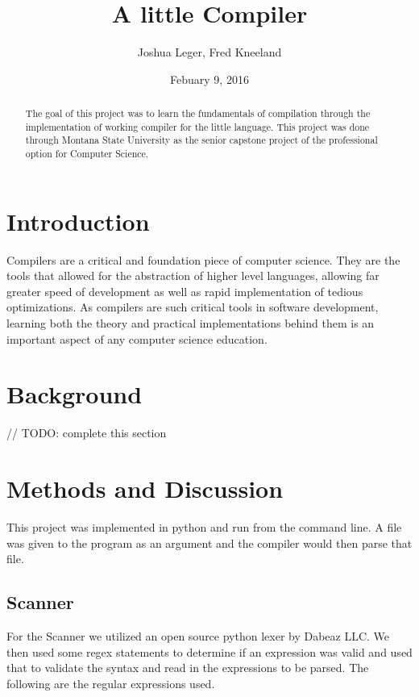 \documentclass[12pt]{article}
\title{A little Compiler}
\author{Joshua Leger, Fred Kneeland}
\date{Febuary 9, 2016}
\begin{document}
    \maketitle
    \begin{abstract}
	
		The goal of this project was to learn the fundamentals of compilation through the implementation of working compiler for the little language.  This project was done through Montana State University as the senior capstone project of the professional option for Computer Science.  	
	
    \end{abstract}
    \clearpage
    \tableofcontents
    \clearpage
    
    \section{Introduction}
		Compilers are a critical and foundation piece of computer science.  They are the tools that allowed for the abstraction of higher level languages, allowing far greater speed of development as well as rapid implementation of tedious optimizations.  As compilers are such critical tools in software development, learning both the theory and practical implementations behind them is an important aspect of any computer science education.
		    
    \section{Background}
    		// TODO: complete this section
    	
    \section{Methods and Discussion}
    
    			This project was implemented in python and run from the command line.  A file was given to the program as an argument and the compiler would then parse that file.
    
    	\subsection{Scanner}
    			For the Scanner we utilized an open source python lexer by Dabeaz LLC.  We then used some regex statements to determine if an expression was valid and used that to validate the syntax and read in the expressions to be parsed. The following are the regular expressions used.
\end{document}
